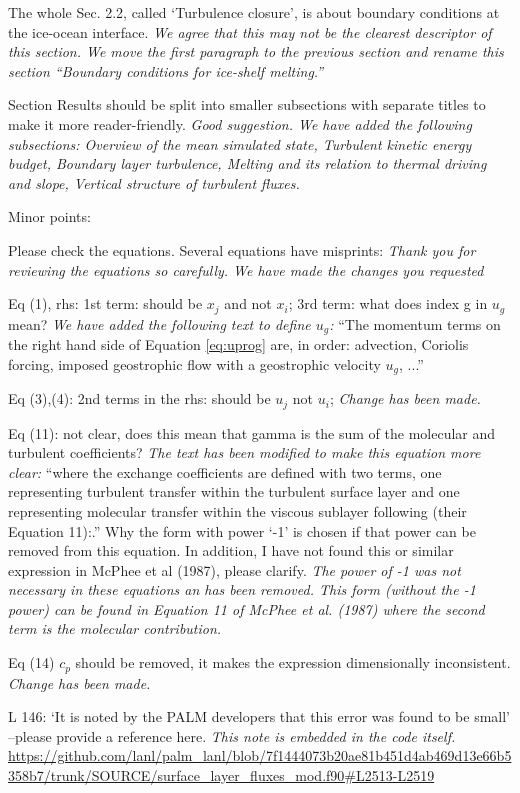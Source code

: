 \documentclass[tc, manuscript]{copernicus}
\begin{document}
The whole Sec. 2.2, called ‘Turbulence closure’, is about boundary conditions at the ice-ocean interface.
\textit{We agree that this may not be the clearest descriptor of this section. We move the first paragraph to the previous section and rename this section ``Boundary conditions for ice-shelf melting.''}

Section Results should be split into smaller subsections with separate titles to make it more reader-friendly.
\textit{Good suggestion. We have added the following subsections: Overview of the mean simulated state, Turbulent kinetic energy budget, Boundary layer turbulence, Melting and its relation to thermal driving and slope, Vertical structure of turbulent fluxes.}


Minor points:

Please check the equations. Several equations have misprints:
\textit{Thank you for reviewing the equations so carefully. We have made the changes you requested}

Eq (1), rhs: 1st term: should be $x_j$ and not $x_i$; 3rd term: what does index g in $u_g$ mean?
\textit{We have added the following text to define $u_g$:}
``The momentum terms on the right hand side of Equation \ref{eq:uprog} are, in order: advection, Coriolis forcing, imposed geostrophic flow with a geostrophic velocity $u_g$, ...''

Eq (3),(4): 2nd terms in the rhs: should be $u_j$ not $u_i$;
\textit{Change has been made.}

Eq (11): not clear, does this mean that gamma is the sum of the molecular and turbulent coefficients? 
\textit{The text has been modified to make this equation more clear:}
``where the exchange coefficients are defined with two terms, one representing turbulent transfer within the turbulent surface layer and one representing molecular transfer within the viscous sublayer following \citet{mcphee_dynamics_1987} (their Equation 11):.''
Why the form with power ‘-1’ is chosen if that power can be removed from this equation. In addition, I have not found this or similar expression in McPhee et al (1987), please clarify.
\textit{The power of -1 was not necessary in these equations an has been removed. This form (without the -1 power) can be found in Equation 11 of McPhee et al. (1987) where the second term is the molecular contribution.}

Eq (14) $c_p$ should be removed, it makes the expression dimensionally inconsistent.
\textit{Change has been made.}

L 146: ‘It is noted by the PALM developers that this error was found to be small’ –please provide a reference here.
\textit{This note is embedded in the code itself.}
\url{https://github.com/lanl/palm_lanl/blob/7f1444073b20ae81b451d4ab469d13e66b5358b7/trunk/SOURCE/surface_layer_fluxes_mod.f90#L2513-L2519}
\end{document}
